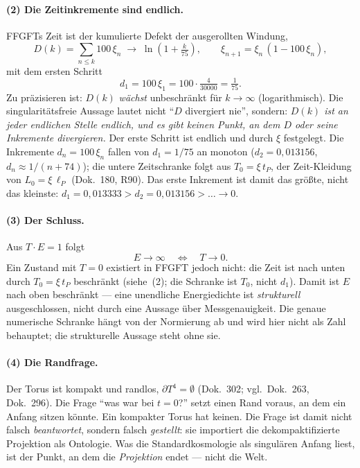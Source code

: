 \paragraph{(2) Die Zeitinkremente sind endlich.} FFGFTs Zeit ist der kumulierte Defekt der
ausgerollten Windung,
\begin{equation}
D(k) = \sum_{n\le k} 100\,\xi_n \;\to\; \ln\!\left(1+\tfrac{k}{75}\right),
\qquad \xi_{n+1} = \xi_n\,(1-100\,\xi_n),
\end{equation}
mit dem ersten Schritt
\begin{equation}
d_1 = 100\,\xi_1 = 100 \cdot \tfrac{4}{30000} = \tfrac{1}{75}.
\end{equation}
Zu präzisieren ist: $D(k)$ \emph{wächst} unbeschränkt für $k\to\infty$ (logarithmisch). Die
singularitätsfreie Aussage lautet nicht \enquote{$D$ divergiert nie}, sondern: \emph{$D(k)$ ist an
jeder endlichen Stelle endlich, und es gibt keinen Punkt, an dem $D$ oder seine Inkremente
divergieren.} Der erste Schritt ist endlich und durch $\xi$ festgelegt. Die Inkremente $d_n = 100\,\xi_n$ fallen von $d_1 = 1/75$ an monoton
($d_2 = 0{,}013156$, $d_n \approx 1/(n+74)$); die untere Zeitschranke folgt aus $T_0 = \xi\,t_P$, der Zeit-Kleidung von $L_0 = \xi\,\ell_P$ (Dok.~180, R90).
Das erste Inkrement ist damit das größte, nicht das kleinste: $d_1 = 0{,}013333 > d_2 = 0{,}013156 > \dots \to 0$.

\paragraph{(3) Der Schluss.} Aus $T\cdot E = 1$ folgt
\begin{equation}
E \to \infty \quad\Longleftrightarrow\quad T \to 0 .
\end{equation}
Ein Zustand mit $T = 0$ existiert in FFGFT jedoch nicht: die Zeit ist nach unten durch
$T_0 = \xi\,t_P$ beschränkt (siehe~(2); die Schranke ist $T_0$, nicht $d_1$). Damit ist $E$ nach oben beschränkt --- eine
unendliche Energiedichte ist \emph{strukturell} ausgeschlossen, nicht durch eine Aussage über
Messgenauigkeit. Die genaue numerische Schranke hängt von der Normierung ab und wird hier nicht
als Zahl behauptet; die strukturelle Aussage steht ohne sie.

\paragraph{(4) Die Randfrage.} Der Torus ist kompakt und randlos, $\partial T^4 = \emptyset$
(Dok.~302; vgl.\ Dok.~263, Dok.~296). Die Frage \enquote{was war bei $t=0$?} setzt einen Rand
voraus, an dem ein Anfang sitzen könnte. Ein kompakter Torus hat keinen. Die Frage ist damit
nicht falsch \emph{beantwortet}, sondern falsch \emph{gestellt}: sie importiert die
dekompaktifizierte Projektion als Ontologie. Was die Standardkosmologie als singulären Anfang
liest, ist der Punkt, an dem die \emph{Projektion} endet --- nicht die Welt.

